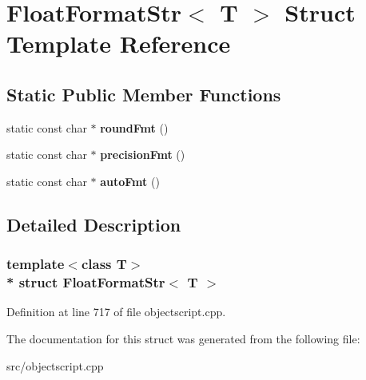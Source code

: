 \hypertarget{struct_float_format_str}{}\section{Float\+Format\+Str$<$ T $>$ Struct Template Reference}
\label{struct_float_format_str}
\subsection*{Static Public Member Functions}
\begin{DoxyCompactItemize}
\item 
static const char $\ast$ {\bfseries round\+Fmt} ()\hypertarget{struct_float_format_str_a3a84d289d5dd001dd6fd8de12da13854}{}\label{struct_float_format_str_a3a84d289d5dd001dd6fd8de12da13854}

\item 
static const char $\ast$ {\bfseries precision\+Fmt} ()\hypertarget{struct_float_format_str_ac57b22395bb791e7bd1c768fe16ab87f}{}\label{struct_float_format_str_ac57b22395bb791e7bd1c768fe16ab87f}

\item 
static const char $\ast$ {\bfseries auto\+Fmt} ()\hypertarget{struct_float_format_str_aed291dc8a022f3d777c93cb4884cbffb}{}\label{struct_float_format_str_aed291dc8a022f3d777c93cb4884cbffb}

\end{DoxyCompactItemize}


\subsection{Detailed Description}
\subsubsection*{template$<$class T$>$\\*
struct Float\+Format\+Str$<$ T $>$}



Definition at line 717 of file objectscript.\+cpp.



The documentation for this struct was generated from the following file\+:\begin{DoxyCompactItemize}
\item 
src/objectscript.\+cpp\end{DoxyCompactItemize}
